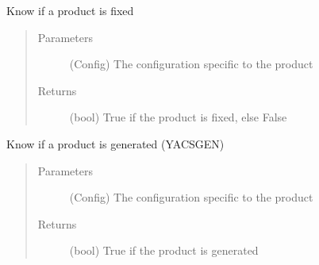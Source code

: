 \documentclass[a4paper,10pt,english]{sphinxmanual}
\begin{document}

\begin{fulllineitems}
\label{\detokenize{apidoc_src/src:src.product.product_is_fixed}}
Know if a product is fixed
\begin{quote}\begin{description}
\item[{Parameters}] \leavevmode
{} \textendash{} (Config)
The configuration specific to the product

\item[{Returns}] \leavevmode
(bool) 
True if the product is fixed, else False

\end{description}\end{quote}

\end{fulllineitems}


\begin{fulllineitems}
\label{\detokenize{apidoc_src/src:src.product.product_is_generated}}
Know if a product is generated (YACSGEN)
\begin{quote}\begin{description}
\item[{Parameters}] \leavevmode
{} \textendash{} (Config)
The configuration specific to the product

\item[{Returns}] \leavevmode
(bool) True if the product is generated

\end{description}\end{quote}

\end{fulllineitems}

\end{document}
